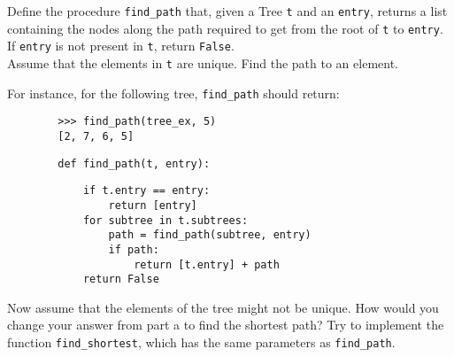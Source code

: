 \question Define the procedure \texttt{find\_path} that, given a Tree \texttt{t} and
an \texttt{entry}, returns a list containing the nodes along the path
required to get from the root of \texttt{t} to \texttt{entry}. If \texttt{entry} is not
present in \texttt{t}, return \texttt{False}.\\
Assume that the elements in \texttt{t} are unique. Find the path to an
        element.

        For instance, for the following tree, \texttt{find\_path} should return:
        \begin{center}
        \end{center}

        \begin{lstlisting}
        >>> find_path(tree_ex, 5)
        [2, 7, 6, 5]
        \end{lstlisting}

        \begin{lstlisting}
        def find_path(t, entry):
        \end{lstlisting}
        \begin{solution}[2.5in]
        \begin{lstlisting}
            if t.entry == entry:
                return [entry]
            for subtree in t.subtrees:
                path = find_path(subtree, entry)
                if path:
                    return [t.entry] + path
            return False
        \end{lstlisting}
        \end{solution}

    \item Now assume that the elements of the tree might not be unique. How
        would you change your answer from part a to find the shortest path?  Try
        to implement the function \texttt{find\_shortest}, which has the same
        parameters as \texttt{find\_path}.

